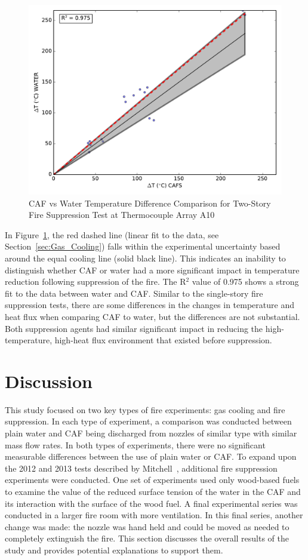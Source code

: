 \documentclass[12pt,oneside]{book}
\begin{document}
\begin{figure}[!ht]
	\includegraphics[width=.7\columnwidth]{../Figures/Script_Figures/TC_A10_scatter}
	\caption{CAF vs Water Temperature Difference Comparison for Two-Story Fire Suppression Test at Thermocouple Array A10}
	\label{fig:fs_a10}
\end{figure}

In Figure~\ref{fig:fs_a10}, the red dashed line (linear fit to the data, see Section~\ref{sec:Gas_Cooling}) falls within the experimental uncertainty based around the equal cooling line (solid black line). This indicates an inability to distinguish whether CAF or water had a more significant impact in temperature reduction following suppression of the fire. The R$^2$ value of 0.975 shows a strong fit to the data between water and CAF. Similar to the single-story fire suppression tests, there are some differences in the changes in temperature and heat flux when comparing CAF to water, but the differences are not substantial. Both suppression agents had similar significant impact in reducing the high-temperature, high-heat flux environment that existed before suppression. 

\chapter{Discussion}
\label{chap:Discussion}

This study focused on two key types of fire experiments: gas cooling and fire suppression. In each type of experiment, a comparison was conducted between plain water and CAF being discharged from nozzles of similar type with similar mass flow rates. In both types of experiments, there were no significant measurable differences between the use of plain water or CAF. To expand upon the 2012 and 2013 tests described by Mitchell~\cite{Mitchell:1}, additional fire suppression experiments were conducted. One set of experiments used only wood-based fuels to examine the value of the reduced surface tension of the water in the CAF and its interaction with the surface of the wood fuel. A final experimental series was conducted in a larger fire room with more ventilation. In this final series, another change was made: the nozzle was hand held and could be moved as needed to completely extinguish the fire. This section discusses the overall results of the study and provides potential explanations to support them.
\end{document}
